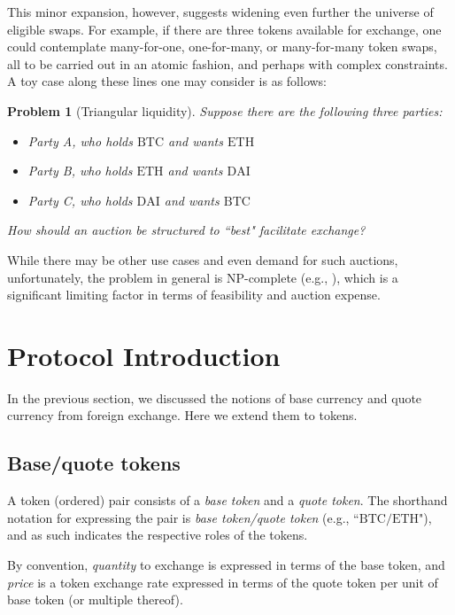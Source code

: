 \documentclass[11pt, reqno]{amsart}
\newtheorem{problem}[thm]{Problem}
\newcommand{\BTC}{\mathrm{BTC}}
\newcommand{\ETH}{\mathrm{ETH}}
\newcommand{\DAI}{\mathrm{DAI}}
\begin{document}
This minor expansion, however, suggests widening even further the universe of
eligible swaps. For example, if there are three tokens available for exchange,
one could contemplate many-for-one, one-for-many, or many-for-many token swaps,
all to be carried out in an atomic fashion, and perhaps with complex
constraints. A toy case along these lines one may consider is as follows:
\begin{problem}[Triangular liquidity]
Suppose there are the following three parties:
\begin{itemize}
	\item Party A, who holds $\BTC$ and wants $\ETH$
	\item Party B, who holds $\ETH$ and wants $\DAI$
	\item Party C, who holds $\DAI$ and wants $\BTC$
\end{itemize}
How should an auction be structured to ``best" facilitate exchange?
\end{problem}
While there may be other use cases and even demand for such auctions,
unfortunately, the problem in general is NP-complete (e.g., \cite{XiStWh05}),
which is a significant limiting factor in terms of feasibility and
auction expense.


\section{Protocol Introduction}
In the previous section, we discussed the notions of base currency and
quote currency from foreign exchange. Here we extend them to tokens.

\subsection{Base/quote tokens}
A token (ordered) pair consists of a \emph{base token} and a
\emph{quote token}. The shorthand notation for expressing the pair is
\emph{base token/quote token} (e.g., ``$\BTC/\ETH$"), and as such indicates the
respective roles of the tokens.

By convention, \emph{quantity} to exchange is expressed in terms of the base
token, and \emph{price} is a token exchange rate expressed in terms of the
quote token per unit of base token (or multiple thereof).
\end{document}
